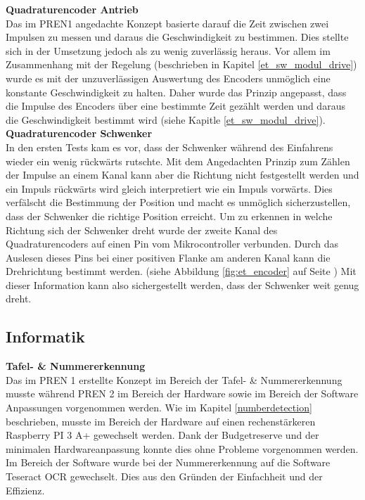 \documentclass[../../main.tex]{subfiles}
\begin{document}
\textbf{Quadraturencoder Antrieb}\\
Das im PREN1 angedachte Konzept basierte darauf die Zeit zwischen zwei Impulsen zu messen und daraus die Geschwindigkeit zu bestimmen. Dies stellte sich in der Umsetzung jedoch als zu wenig zuverlässig heraus. Vor allem im Zusammenhang mit der Regelung (beschrieben in Kapitel \ref{et_sw_modul_drive}) wurde es mit der unzuverlässigen Auswertung des Encoders unmöglich eine konstante Geschwindigkeit zu halten. Daher wurde das Prinzip angepasst, dass die Impulse des Encoders über eine bestimmte Zeit gezählt werden und daraus die Geschwindigkeit bestimmt wird (siehe Kapitle \ref{et_sw_modul_drive}).\\

\textbf{Quadraturencoder Schwenker}\\
In den ersten Tests kam es vor, dass der Schwenker während des Einfahrens wieder ein wenig rückwärts rutschte. Mit dem Angedachten Prinzip zum Zählen der Impulse an einem Kanal kann aber die Richtung nicht festgestellt werden und ein Impuls rückwärts wird gleich interpretiert wie ein Impuls vorwärts. Dies verfälscht die Bestimmung der Position und macht es unmöglich sicherzustellen, dass der Schwenker die richtige Position erreicht. Um zu erkennen in welche Richtung sich der Schwenker dreht wurde der zweite Kanal des Quadraturencoders auf einen Pin vom Mikrocontroller verbunden. Durch das Auslesen dieses Pins bei einer positiven Flanke am anderen Kanal kann die Drehrichtung bestimmt werden. (siehe Abbildung \ref{fig:et_encoder} auf Seite \pageref{fig:et_encoder}) Mit dieser Information kann also sichergestellt werden, dass der Schwenker weit genug dreht.\\ 

\subsection{Informatik}

\textbf{Tafel- \& Nummererkennung}\\
Das im PREN 1 erstellte Konzept im Bereich der Tafel- \& Nummererkennung musste während PREN 2 im Bereich der Hardware sowie im Bereich der Software Anpassungen vorgenommen werden. Wie im Kapitel \ref{numberdetection} beschrieben, musste im Bereich der Hardware auf einen rechenstärkeren Raspberry PI 3 A+ gewechselt werden. Dank der Budgetreserve und der minimalen Hardwareanpassung konnte dies ohne Probleme vorgenommen werden. Im Bereich der Software wurde bei der Nummererkennung auf die Software Teseract OCR gewechselt. Dies aus den Gründen der Einfachheit und der Effizienz. 
\end{document}
